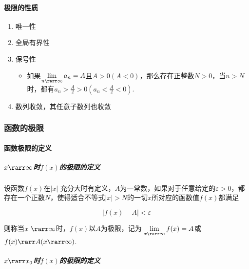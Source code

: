 \documentclass[
]{article}
\begin{document}
\hypertarget{ux6781ux9650ux7684ux6027ux8d28-1}{%
\paragraph{极限的性质}\label{ux6781ux9650ux7684ux6027ux8d28-1}}

\begin{enumerate}
\def\labelenumi{\arabic{enumi}.}
\item
  唯一性
\item
  全局有界性
\item
  保号性

  \begin{itemize}
  \item
    如果\(\lim\limits_{n \rarr \infty}a_n = A\)且\(A > 0(A< 0)\)，那么存在正整数\(N > 0\)，当\(n > N\)时，都有\(a_n > \frac{A}{2} >0(a_n < \frac{A}{2}<0)\).
  \end{itemize}
\item
  数列收敛，其任意子数列也收敛
\end{enumerate}

\hypertarget{ux51fdux6570ux7684ux6781ux9650}{%
\subsubsection{函数的极限}\label{ux51fdux6570ux7684ux6781ux9650}}

\hypertarget{ux51fdux6570ux6781ux9650ux7684ux5b9aux4e49}{%
\paragraph{函数极限的定义}\label{ux51fdux6570ux6781ux9650ux7684ux5b9aux4e49}}

\hypertarget{xux2192ux221euxaux65f6uxafxuxaux7684ux6781ux9650ux7684ux5b9aux4e49}{%
\subparagraph{\texorpdfstring{\(x \rarr \infty\)时\(f(x)\)的极限的定义}{x \textbackslash rarr \textbackslash infty时f(x)的极限的定义}}\label{xux2192ux221euxaux65f6uxafxuxaux7684ux6781ux9650ux7684ux5b9aux4e49}}

设函数\(f(x)\)在\({\vert x\vert}\)
充分大时有定义，\(A\)为一常数，如果对于任意给定的\(\varepsilon > 0\)，都存在一个正数\(N\)，使得适合不等式\({\vert x\vert} > N\)的一切\(x\)所对应的函数值\(f(x)\)都满足

\[{\vert f(x) - A\vert} < \varepsilon\]

则称当\(x \ \rarr \infty\)时，\(f(x)\)以\(A\)为极限，记为
\(\lim\limits_{x \rarr \infty} f(x) =A\)或\(f(x) \rarr A(x \rarr \infty)\).

\hypertarget{xux2192x0uxaux65f6uxafxuxaux7684ux6781ux9650ux7684ux5b9aux4e49}{%
\subparagraph{\texorpdfstring{\(x \rarr x_0\)时\(f(x)\)的极限的定义}{x \textbackslash rarr x\_0时f(x)的极限的定义}}\label{xux2192x0uxaux65f6uxafxuxaux7684ux6781ux9650ux7684ux5b9aux4e49}}
\end{document}
